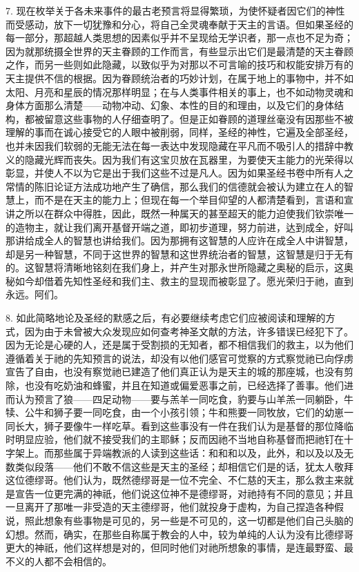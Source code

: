 7. 现在枚举关于各未来事件的最古老预言将显得繁琐，为使怀疑者因它们的神性而受感动，放下一切犹豫和分心，将自己全灵魂奉献于天主的言语。但如果圣经的每一部分，那超越人类思想的因素似乎并不呈现给无学识者，那一点也不足为奇；因为就那统摄全世界的天主眷顾的工作而言，有些显示出它们是最清楚的天主眷顾之作，而另一些则如此隐藏，以致似乎为对那以不可言喻的技巧和权能安排万有的天主提供不信的根据。因为眷顾统治者的巧妙计划，在属于地上的事物中，并不如太阳、月亮和星辰的情况那样明显；在与人类事件相关的事上，也不如动物灵魂和身体方面那么清楚——动物冲动、幻象、本性的目的和理由，以及它们的身体结构，都被留意这些事物的人仔细查明了。但是正如眷顾的道理丝毫没有因那些不被理解的事而在诚心接受它的人眼中被削弱，同样，圣经的神性，它遍及全部圣经，也并未因我们软弱的无能无法在每一表达中发现隐藏在平凡而不吸引人的措辞中教义的隐藏光辉而丧失。因为我们有这宝贝放在瓦器里，为要使天主能力的光荣得以彰显，并使人不以为它是出于我们这些不过是凡人。因为如果圣经书卷中所有人之常情的陈旧论证方法成功地产生了确信，那么我们的信德就会被认为建立在人的智慧上，而不是在天主的能力上；但现在每一个举目仰望的人都清楚看到，言语和宣讲之所以在群众中得胜，因此，既然一种属天的甚至超天的能力迫使我们钦崇唯一的造物主，就让我们离开基督开端之道，即初步道理，努力前进，达到成全，好叫那讲给成全人的智慧也讲给我们。因为那拥有这智慧的人应许在成全人中讲智慧，却是另一种智慧，不同于这世界的智慧和这世界统治者的智慧，这智慧是归于无有的。这智慧将清晰地铭刻在我们身上，并产生对那永世所隐藏之奥秘的启示，这奥秘如今却借着先知性圣经和我们主、救主的显现而被彰显了。愿光荣归于祂，直到永远。阿们。\par

8. 如此简略地论及圣经的默感之后，有必要继续考虑它们应被阅读和理解的方式，因为由于未曾被大众发现应如何查考神圣文献的方法，许多错误已经犯下了。因为无论是心硬的人，还是属于受割损的无知者，都不相信我们的救主，以为他们遵循着关于祂的先知预言的说法，却没有以他们感官可觉察的方式察觉祂已向俘虏宣告了自由，也没有察觉祂已建造了他们真正认为是天主的城的那座城，也没有剪除，也没有吃奶油和蜂蜜，并且在知道或偏爱恶事之前，已经选择了善事。他们进而认为预言了狼——四足动物——要与羔羊一同吃食，豹要与山羊羔一同躺卧，牛犊、公牛和狮子要一同吃食，由一个小孩引领；牛和熊要一同牧放，它们的幼崽一同长大，狮子要像牛一样吃草。看到这些事没有一件在我们认为是基督的那位降临时明显应验，他们就不接受我们的主耶稣；反而因祂不当地自称基督而把祂钉在十字架上。而那些属于异端教派的人读到这些话：和和和以及，此外，和以及以及无数类似段落——他们不敢不信这些是天主的圣经；却相信它们是的话，犹太人敬拜这位德缪哥。他们认为，既然德缪哥是一位不完全、不仁慈的天主，那么救主来就是宣告一位更完满的神祇，他们说这位神不是德缪哥，对祂持有不同的意见；并且一旦离开了那唯一非受造的天主德缪哥，他们就投身于虚构，为自己捏造各种假说，照此想象有些事物是可见的，另一些是不可见的，这一切都是他们自己头脑的幻想。然而，确实，在那些自称属于教会的人中，较为单纯的人认为没有比德缪哥更大的神祇，他们这样想是对的，但同时他们对祂所想象的事情，是连最野蛮、最不义的人都不会相信的。\par


